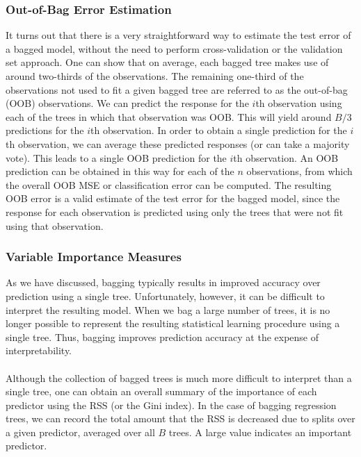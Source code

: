 \subsubsection{Out-of-Bag Error Estimation}
It turns out that there is a very straightforward way to estimate the test error of a bagged model, without the need to perform cross-validation or the validation set approach. One can show that on average, each bagged tree makes use of around two-thirds of the observations. The remaining one-third of the observations not used to fit a given bagged tree are referred to as the out-of-bag (OOB) observations. We can predict the response for the $i$th observation using each of the trees in which that observation was OOB. This will yield around $B/3$ predictions for the $i$th observation. In order to obtain a single prediction for the $i$th observation, we can average these predicted responses (or can take a majority vote). This leads to a single OOB prediction for the $i$th observation. An OOB prediction can be obtained in this way for each of the $n$ observations, from which the overall OOB MSE or classification error can be computed. The resulting OOB error is a valid estimate of the test error for the bagged model, since the response for each observation is predicted using only the trees that were not fit using that observation.

\subsubsection{Variable Importance Measures}
As we have discussed, bagging typically results in improved accuracy over
prediction using a single tree. Unfortunately, however, it can be difficult to
interpret the resulting model. When we bag a large number of trees, it is no longer possible to represent the resulting statistical learning procedure using a single tree. Thus, bagging improves prediction accuracy at the expense of interpretability.\\\\
Although the collection of bagged trees is much more difficult to interpret
than a single tree, one can obtain an overall summary of the importance of
each predictor using the RSS (or the Gini index). In the case of bagging regression trees, we can record the total amount that the RSS  is decreased due to splits over a given predictor, averaged over all $B$ trees. A large value indicates an important predictor.

